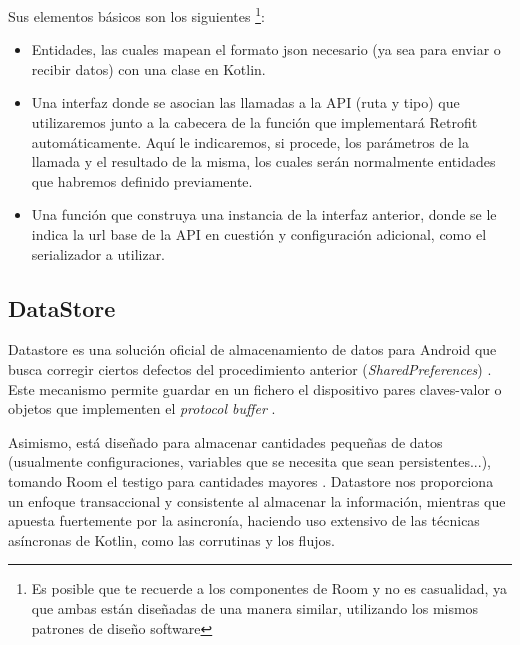             Sus elementos básicos son los siguientes \cite{noauthor_retrofit_nodate} \footnote{Es posible que te 
            recuerde a los componentes de Room y 
            no es casualidad, ya que ambas están diseñadas de una manera similar, utilizando los mismos patrones de
            diseño software}:
            \begin{itemize}
                \item Entidades, las cuales mapean el formato json necesario (ya sea para enviar o recibir datos) con 
                una clase en Kotlin.
                \item Una interfaz donde se asocian las llamadas a la API (ruta y tipo) que utilizaremos junto a la 
                cabecera de la función que implementará Retrofit automáticamente. Aquí le indicaremos, si procede, los
                parámetros de la llamada y el resultado de la misma, los cuales serán normalmente entidades que habremos
                definido previamente.
                \item Una función que construya una instancia de la interfaz anterior, donde se le indica la url base de
                la API en cuestión y configuración adicional, como el serializador a utilizar.
            \end{itemize}

        \subsection{DataStore}

            Datastore es una solución oficial de almacenamiento de datos para Android que busca corregir ciertos
            defectos del procedimiento anterior (\textit{SharedPreferences}) \cite{marosfalvi_new_2021} 
            \cite{noauthor_arquitectura_nodate-1}. Este mecanismo permite guardar en 
            un fichero el dispositivo pares claves-valor o objetos que implementen el \textit{protocol buffer} 
            \cite{keepcoding_usar_2022}.

            Asimismo, está diseñado para almacenar cantidades pequeñas de datos (usualmente configuraciones, variables
            que se necesita que sean persistentes...), tomando Room el testigo para
            cantidades mayores \cite{sakunia_preference_2022}. Datastore nos proporciona un enfoque transaccional
            y consistente al almacenar la información, mientras que apuesta fuertemente por la asincronía, haciendo
            uso extensivo de las técnicas asíncronas de Kotlin, como las corrutinas y los flujos.
            
